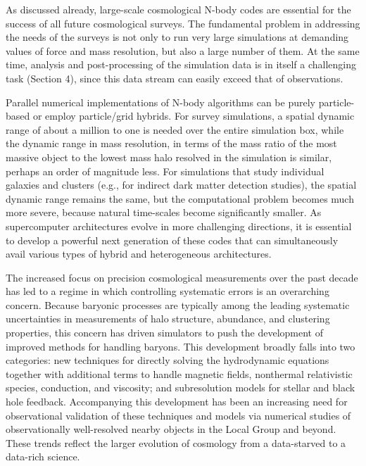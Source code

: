 As discussed already, large-scale cosmological N-body codes are
essential for the success of all future cosmological surveys. The
fundamental problem in addressing the needs of the surveys is not only
to run very large simulations at demanding values of force and mass
resolution, but also a large number of them. At the same time,
analysis and post-processing of the simulation data is in itself a
challenging task (Section 4), since this data stream can easily exceed
that of observations.

Parallel numerical implementations of N-body algorithms can be purely
particle-based or employ particle/grid hybrids. For survey
simulations, a spatial dynamic range of about a million to one is
needed over the entire simulation box, while the dynamic range in mass
resolution, in terms of the mass ratio of the most massive object to
the lowest mass halo resolved in the simulation is similar, perhaps an
order of magnitude less. For simulations that study individual
galaxies and clusters (e.g., for indirect dark matter detection
studies), the spatial dynamic range remains the same, but the
computational problem becomes much more severe, because natural
time-scales become significantly smaller. As supercomputer
architectures evolve in more challenging directions, it is essential
to develop a powerful next generation of these codes that can
simultaneously avail various types of hybrid and heterogeneous
architectures.

\medskip


The increased focus on precision cosmological measurements over the
past decade has led to a regime in which controlling systematic
errors is an overarching concern. Because baryonic processes are
typically among the leading systematic uncertainties in measurements
of halo structure, abundance, and clustering properties, this concern
has driven simulators to push the development of improved methods for
handling baryons. This development broadly falls into two categories:
new techniques for directly solving the hydrodynamic equations
together with additional terms to handle magnetic fields, nonthermal
relativistic species, conduction, and viscosity; and subresolution
models for stellar and black hole feedback. Accompanying this
development has been an increasing need for observational validation
of these techniques and models via numerical studies of
observationally well-resolved nearby objects in the Local Group and
beyond. These trends reflect the larger evolution of cosmology from a
data-starved to a data-rich science.

